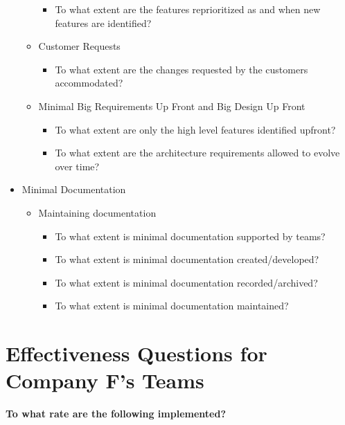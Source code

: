 \begin{appendices}
\begin{itemize}
\begin{itemize}
\begin{itemize}
					\item To what extent are the features reprioritized as and when new features are identified?
				\end{itemize}
			\item Customer Requests
				\begin{itemize}
					\item To what extent are the changes requested by the customers accommodated?
				\end{itemize}
			\item Minimal Big Requirements Up Front and Big Design Up Front
				\begin{itemize}
					\item To what extent are only the high level features identified upfront?
					\item To what extent are the architecture requirements allowed to evolve over time?
				\end{itemize}
		\end{itemize}
	\item Minimal Documentation
		\begin{itemize}
			\item Maintaining documentation 
				\begin{itemize}
					\item To what extent is minimal documentation supported by teams?
					\item To what extent is minimal documentation created/developed?
					\item To what extent is minimal documentation recorded/archived?
					\item To what extent is minimal documentation maintained?
				\end{itemize}
		\end{itemize}
\end{itemize}


\chapter{Effectiveness Questions for Company F's Teams}
\label{sec:effectiveness_survey}

{\large \textbf{To what rate are the following implemented?}}


\end{appendices}

